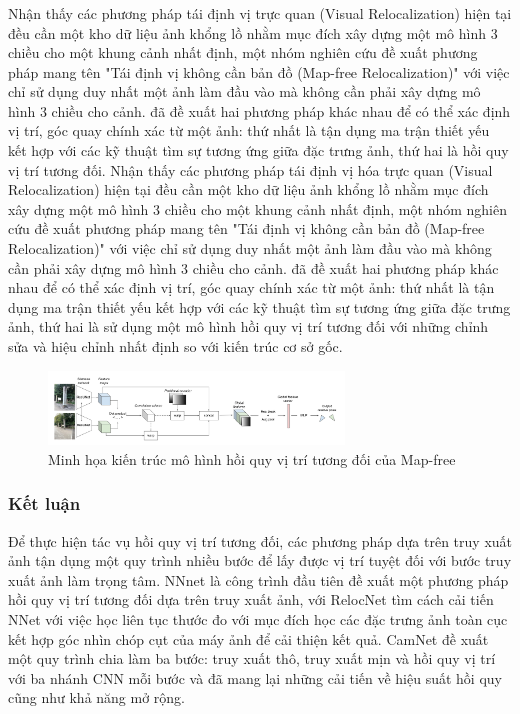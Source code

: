 \subsubsection*{}
Nhận thấy các phương pháp tái định vị trực quan (Visual Relocalization) hiện tại đều cần một kho dữ liệu ảnh khổng lồ nhằm mục đích xây dựng một mô hình 3 chiều cho một khung cảnh nhất định, một nhóm nghiên cứu \cite{arnold2022mapfree} đề xuất phương pháp mang tên "Tái định vị không cần bản đồ (Map-free Relocalization)" với việc chỉ sử dụng duy nhất một ảnh làm đầu vào mà không cần phải xây dựng mô hình 3 chiều cho cảnh. \cite{arnold2022mapfree} đã đề xuất hai phương pháp khác nhau để có thể xác định vị trí, góc quay chính xác từ một ảnh: thứ nhất là tận dụng ma trận thiết yếu kết hợp với các kỹ thuật tìm sự tương ứng giữa đặc trưng ảnh, thứ hai là hồi quy vị trí tương đối.
Nhận thấy các phương pháp tái định vị hóa trực quan (Visual Relocalization) hiện tại đều cần một kho dữ liệu ảnh khổng lồ nhằm mục đích xây dựng một mô hình 3 chiều cho một khung cảnh nhất định, một nhóm nghiên cứu \cite{arnold2022mapfree} đề xuất phương pháp mang tên "Tái định vị không cần bản đồ (Map-free Relocalization)" với việc chỉ sử dụng duy nhất một ảnh làm đầu vào mà không cần phải xây dựng mô hình 3 chiều cho cảnh. \cite{arnold2022mapfree} đã đề xuất hai phương pháp khác nhau để có thể xác định vị trí, góc quay chính xác từ một ảnh: thứ nhất là tận dụng ma trận thiết yếu kết hợp với các kỹ thuật tìm sự tương ứng giữa đặc trưng ảnh, thứ hai là sử dụng một mô hình hồi quy vị trí tương đối với những chỉnh sửa và hiệu chỉnh nhất định so với kiến trúc cơ sở gốc.
\begin{figure}[H]
    \centering
    \includegraphics[width=0.7\textwidth]{pics/Chapter2/mapfreeRPR}
    \caption{Minh họa kiến trúc mô hình hồi quy vị trí tương đối của Map-free \cite{arnold2022mapfree}}
\end{figure}

\subsubsection*{Kết luận}
Để thực hiện tác vụ hồi quy vị trí tương đối, các phương pháp dựa trên truy xuất ảnh \cite{laskar2017camera, 10.1007/978-3-030-01264-9_46, 9008579, zhou2020learn} tận dụng một quy trình nhiều bước để lấy được vị trí tuyệt đối với bước truy xuất ảnh làm trọng tâm. NNnet \cite{laskar2017camera} là công trình đầu tiên đề xuất một phương pháp hồi quy vị trí tương đối dựa trên truy xuất ảnh, với RelocNet \cite{10.1007/978-3-030-01264-9_46} tìm cách cải tiến NNet với việc học liên tục thước đo với mục đích học các đặc trưng ảnh toàn cục kết hợp góc nhìn chóp cụt của máy ảnh để cải thiện kết quả. CamNet \cite{9008579} đề xuất một quy trình chia làm ba bước: truy xuất thô, truy xuất mịn và hồi quy vị trí với ba nhánh CNN mỗi bước và đã mang lại những cải tiến về hiệu suất hồi quy cũng như khả năng mở rộng. 

